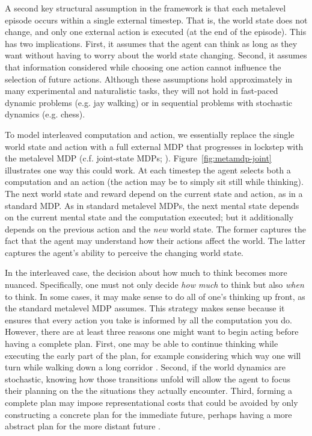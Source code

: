 A second key structural assumption in the framework is that each metalevel episode occurs within a single external timestep. That is, the world state does not change, and only one external action is executed (at the end of the episode). This has two implications. First, it assumes that the agent can think as long as they want without having to worry about the world state changing. Second, it assumes that information considered while choosing one action cannot influence the selection of future actions. Although these assumptions hold approximately in many experimental and naturalistic tasks, they will not hold in fast-paced dynamic problems (e.g. jay walking) or in sequential problems with stochastic dynamics (e.g. chess).

To model interleaved computation and action, we essentially replace the single world state and action with a full external MDP that progresses in lockstep with the metalevel MDP (c.f. joint-state MDPs; \citealp{russell1991right,parr1998reinforcement,hay2016principles}). Figure~\ref{fig:metamdp-joint} illustrates one way this could work. At each timestep the agent selects both a computation and an action (the action may be to simply sit still while thinking). The next world state and reward depend on the current state and action, as in a standard MDP. As in standard metalevel MDPs, the next mental state depends on the current mental state and the computation executed; but it additionally depends on the previous action and the \emph{new} world state. The former captures the fact that the agent may understand how their actions affect the world. The latter captures the agent's ability to perceive the changing world state.

In the interleaved case, the decision about how much to think becomes more nuanced. Specifically, one must not only decide \emph{how much} to think but also \emph{when} to think. In some cases, it may make sense to do all of one's thinking up front, as the standard metalevel MDP assumes. This strategy makes sense because it ensures that every action you take is informed by all the computation you do. However, there are at least three reasons one might want to begin acting before having a complete plan. First, one may be able to continue thinking while executing the early part of the plan, for example considering which way one will turn while walking down a long corridor \citep{oceallaigh2015metareasoning}. Second, if the world dynamics are stochastic, knowing how those transitions unfold will allow the agent to focus their planning on the the situations they actually encounter. Third, forming a complete plan may impose representational costs that could be avoided by only constructing a concrete plan for the immediate future, perhaps having a more abstract plan for the more distant future \citep{ho2020efficiency}.


